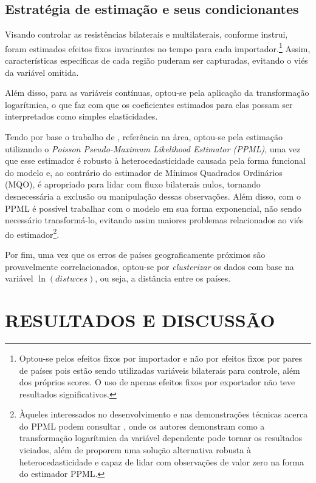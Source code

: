 \subsection{Estratégia de estimação e seus condicionantes}

Visando controlar as resistências bilaterais e multilaterais, conforme  instrui, foram estimados efeitos fixos invariantes no tempo para cada importador.\footnote{Optou-se pelos efeitos fixos por importador e não por efeitos fixos por pares de países pois estão sendo utilizadas variáveis bilaterais para controle, além dos próprios scores. O uso de apenas efeitos fixos por exportador não teve resultados significativos.} Assim, características específicas de cada região puderam ser capturadas, evitando o viés da variável omitida. 

Além disso, para as variáveis contínuas, optou-se pela aplicação da transformação logarítmica, o que faz com que os coeficientes estimados para elas possam ser interpretados como simples elasticidades.

Tendo por base o trabalho de , referência na área, optou-se pela estimação utilizando o \textit{Poisson Pseudo-Maximum Likelihood Estimator (PPML)}, uma vez que esse estimador é robusto à heterocedasticidade causada pela forma funcional do modelo e, ao contrário do estimador de Mínimos Quadrados Ordinários (MQO), é apropriado para lidar com fluxo bilaterais nulos, tornando desnecessária a exclusão ou manipulação dessas observações. Além disso, com o PPML é possível trabalhar com o modelo em sua forma exponencial, não sendo necessário transformá-lo, evitando assim maiores problemas relacionados ao viés do estimador\footnote{Àqueles interessados no desenvolvimento e nas demonstrações técnicas acerca do PPML podem consultar , onde os autores demonstram como a transformação logarítmica da variável dependente pode tornar os resultados viciados, além de proporem uma solução alternativa robusta à heterocedasticidade e capaz de lidar com observações de valor zero na forma do estimador PPML.}.

Por fim, uma vez que os erros de países geograficamente próximos são provavelmente correlacionados, optou-se por \textit{clusterizar} os dados com base na variável $\ln(distwces)$, ou seja, a distância entre os países.


\section{RESULTADOS E DISCUSSÃO}

